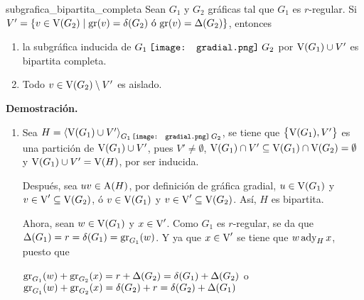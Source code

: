 \documentclass[fleqn, 11pt]{beamer}
\newcommand{\gradial}{\hspace{0.9mm} \texttt{[image: gradial.png]} \hspace{1mm}}
\begin{document}
    \begin{teorema}[breakable, pad at break = 4mm, beforeafter skip = 4mm]{}{subgrafica_bipartita_completa}
        Sean $ G_1 $ y $ G_2 $ gráficas tal que $ G_1 $ es $ r $-regular. Si $ V' = \left\lbrace v \in \textnormal{V}(G_2) \mid \textnormal{gr}(v) = \delta(G_2) \textnormal{ ó gr}(v) = \Delta(G_2) \right\rbrace $, entonces \vspace{3mm}
        
        \begin{enumerate}
            \item la subgráfica inducida de $ G_1 \gradial G_2 $ por $ \textnormal{V}(G_1) \cup V' $ es bipartita completa.
            \item Todo $ v \in \textnormal{V}(G_2) \setminus V' $ es aislado.
        \end{enumerate}

        \tcblower

        \textbf{Demostración.} \vspace{3mm}

        \begin{enumerate}
            \item Sea $ H = \left\langle \textnormal{V}(G_1) \cup V' \right\rangle_{G_1 \! \gradial \! G_2} $, se tiene que $ \bigl\{ \textnormal{V}(G_1), V' \bigr\} $ es una partición de $ \textnormal{V}(G_1) \cup V' $, pues $ V' \neq \emptyset $, $ \textnormal{V}(G_1) \cap V' \subseteq \textnormal{V}(G_1) \cap \textnormal{V}(G_2) = \emptyset $ y $ \textnormal{V}(G_1) \cup V' = \textnormal{V}(H) $, por ser inducida. \vspace{2mm}

            Después, sea $ uv \in \textnormal{A}(H) $, por definición de gráfica gradial, $ u \in \textnormal{V}(G_1) $ y $ v \in \textnormal{V}' \subseteq \textnormal{V}(G_2) $, ó $ v \in \textnormal{V}(G_1) $ y $ v \in \textnormal{V}' \subseteq \textnormal{V}(G_2) $. Así, $ H $ es bipartita. \vspace{2mm}
    
            Ahora, sean $ w \in \textnormal{V}(G_1) $ y $ x \in \textnormal{V}' $. Como $ G_1 $ es $ r $-regular, se da que $ \Delta(G_1) = r = \delta(G_1) = \textnormal{gr}_{G_1}(w) $. Y ya que $ x \in \textnormal{V}' $ se tiene que $ w \, \textnormal{ady}_H \, x $, puesto que \vspace{2mm}
            
            $ \textnormal{gr}_{G_1}(w) + \textnormal{gr}_{G_2}(x) = r + \Delta(G_2) = \delta(G_1) + \Delta(G_2) $ \; o \; $ \textnormal{gr}_{G_1}(w) + \textnormal{gr}_{G_2}(x) = \delta(G_2) + r = \delta(G_2) + \Delta(G_1) $ \vspace{2mm}
            

\end{enumerate}
\end{teorema}
\end{document}

